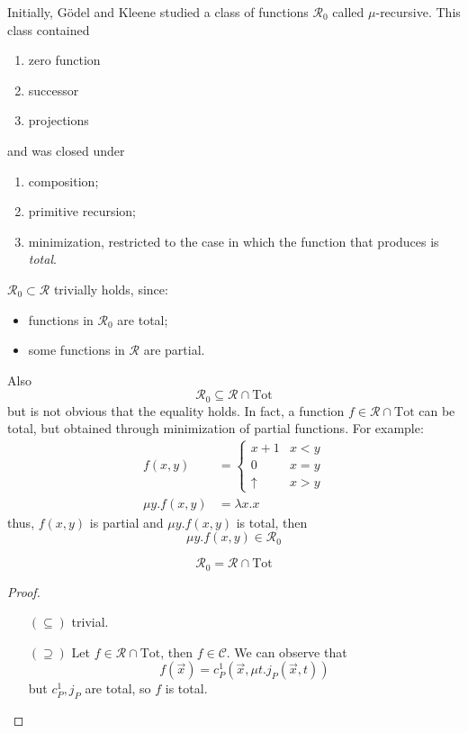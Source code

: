 \begin{observation}
Initially, Gödel and Kleene studied a class
of functions $\mathcal{R}_0$ called $\mu$-recursive. This class
contained
\begin{enumerate}[label=\alph*]
\item zero function
\item successor
\item projections
\end{enumerate}
and was closed under
\begin{enumerate}
\item composition;
\item primitive recursion;
\item minimization, restricted to the case in which the function that
  produces is \emph{total}.
\end{enumerate}
$\mathcal{R}_0 \subset \mathcal{R}$ trivially holds, since:
\begin{itemize}
\item functions in $\mathcal{R}_0$ are total;
\item some functions in $\mathcal{R}$ are partial.
\end{itemize}

Also \[\mathcal{R}_0 \subseteq \mathcal{R} \cap \text{Tot}\] but is
not obvious that the equality holds. In fact, a function
$f \in \mathcal{R} \cap \text{Tot}$ can be total, but obtained through
minimization of partial functions. For example:
\begin{align*}
  f(x,y) &= \begin{cases}
    x+1 & x<y \\
    0 & x=y \\
    \uparrow & x>y
  \end{cases} \\
  \mu y . f(x,y) &= \lambda x . x
\end{align*}
thus, $f(x,y)$ is partial and
$\mu y . f(x,y)$ is total, then \[\mu y . f(x,y) \in \mathcal{R}_0\]
\begin{theorem}
  \[\mathcal{R}_0 = \mathcal{R}\cap \text{Tot}\]
  \begin{proof}
    \begin{enumerate}
    \item[$(\subseteq)$] trivial.
    \item[$(\supseteq)$] Let $f \in \mathcal{R} \cap \text{Tot}$, then
      $f \in \mathcal{C}$.
      We can observe that
      \[f(\vec{x}) = c_P^1 ( \vec{x} , \mu t . j_P(\vec{x}, t))\]
      but $c_P^1, j_P$ are total, so $f$ is total.
    \end{enumerate}
  \end{proof}
\end{theorem}
\end{observation}


